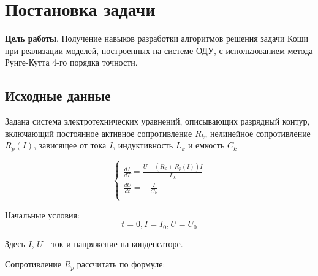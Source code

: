 \documentclass[a4paper,oneside,12pt]{extreport}
\begin{document}


\section{Постановка задачи}
\textbf{Цель работы}. 
Получение навыков разработки алгоритмов решения задачи Коши при реализации моделей, построенных на системе ОДУ, 
с использованием метода Рунге-Кутта 4-го порядка точности.

\subsection{Исходные данные}

Задана система электротехнических уравнений, описывающих разрядный контур,
включающий постоянное активное сопротивление $R_k$, нелинейное сопротивление $R_p(I)$,
зависящее от тока $I$, индуктивность $L_k$ и емкость $C_k$

\begin{figure}[ht!]
\end{figure}

\begin{equation*}
     \begin{cases}
        \frac{dI}{dT} = \frac{U - (R_k + R_p(I))I}{L_k} \\ 
        \frac{dU}{dt} = -\frac{I}{C_k} \\ 
     \end{cases}
\end{equation*}

Начальные условия:
\begin{equation*}
t=0, I=I_0, U=U_0
\end{equation*}

Здесь $I$, $U$ - ток и напряжение на конденсаторе.

Сопротивление $R_p$ рассчитать по формуле:
\end{document}
